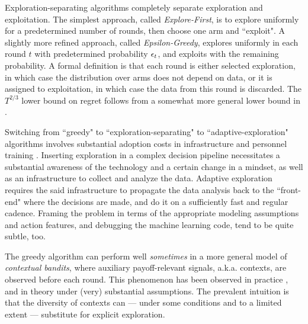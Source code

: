 Exploration-separating algorithms completely separate exploration and exploitation. The simplest approach, called \emph{Explore-First}, is to explore uniformly for a predetermined number of rounds, then choose one arm and ``exploit". A slightly more refined approach, called \emph{Epsilon-Greedy}, explores uniformly in each round $t$ with predetermined probability $\epsilon_t$, and exploits with the remaining probability. A formal definition is that each round is either selected exploration, in which case  the distribution over arms does not depend on data, or it is assigned to exploitation, in which case the data from this round is discarded. The $T^{2/3}$ lower bound on regret follows from a somewhat more general lower bound in \citet{MechMAB-ec09}.

Switching from ``greedy" to ``exploration-separating" to ``adaptive-exploration" algorithms involves substantial adoption costs in infrastructure and personnel training \citep{DS-arxiv}. Inserting exploration in a complex decision pipeline necessitates a substantial awareness of the technology and a certain change in a mindset, as well as an infrastructure to collect and analyze the data. Adaptive exploration requires the said infrastructure to propagate the data analysis back to the ``front-end" where the decisions are made, and do it on a sufficiently fast and regular cadence. Framing the problem in terms of the appropriate modeling assumptions and action features, and debugging the machine learning code, tend to be quite subtle, too.

The greedy algorithm can perform well \emph{sometimes} in a more general model of \emph{contextual bandits}, where auxiliary payoff-relevant signals, a.k.a. contexts, are observed before each round. This phenomenon has been observed in practice
\citep{practicalCB-arxiv18}, and in theory \citep{kannan2018smoothed,bastani2017exploiting,externalities-colt18} under (very) substantial assumptions. The prevalent intuition is that the diversity of contexts can --- under some conditions and to a limited extent --- substitute for explicit exploration.




